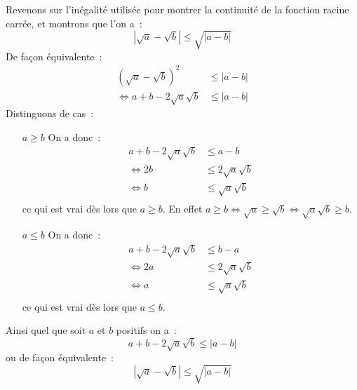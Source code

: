 \documentclass[10pt,notheorems]{beamer}
\theoremstyle{plain}
\theoremstyle{definition} %
\begin{document}
\begin{notes}
  Revenons sur l'inégalité utilisée pour montrer la continuité de la fonction racine carrée, et montrons que l'on a~:
  \[
    |\sqrt{a}-\sqrt{b}| \leq \sqrt{|a-b|}
  \]
  De façon équivalente~:
  \[
    \begin{split}
      (\sqrt{a}-\sqrt{b})^2&\leq |a-b|\\
      \Leftrightarrow a+b-2\sqrt{a}\sqrt{b} &\leq |a-b|
    \end{split}
  \]
  Distinguons de cas~:
  \medskip
  \begin{itemize}
  \item [$a \geq b$] On a donc~:
    \[
      \begin{split}
        a+b-2\sqrt{a}\sqrt{b} &\leq a-b\\
        \Leftrightarrow 2b &\leq 2\sqrt{a}\sqrt{b}\\
        \Leftrightarrow b &\leq \sqrt{a}\sqrt{b}\\
      \end{split}
    \]
    ce qui est vrai dès lors que $a\geq b$. En effet $a\geq b \Leftrightarrow \sqrt{a}\geq\sqrt{b} \Leftrightarrow \sqrt{a}\sqrt{b} \geq b$.

  \item [$a \leq b$] On a donc~:
    \[
      \begin{split}
        a+b-2\sqrt{a}\sqrt{b} &\leq b-a\\
        \Leftrightarrow 2a &\leq 2\sqrt{a}\sqrt{b}\\
        \Leftrightarrow a &\leq \sqrt{a}\sqrt{b}\\
      \end{split}
    \]
    ce qui est vrai dès lors que $a\leq b$.
  \end{itemize}

  \medskip

  Ainsi quel que soit $a$ et $b$ positifs on a~:
  \[
    a+b-2\sqrt{a}\sqrt{b} \leq |a-b|
  \]
  ou de façon équivalente~:
  \[
    |\sqrt{a}-\sqrt{b}| \leq \sqrt{|a-b|}
  \]

\end{notes}
\end{document}
